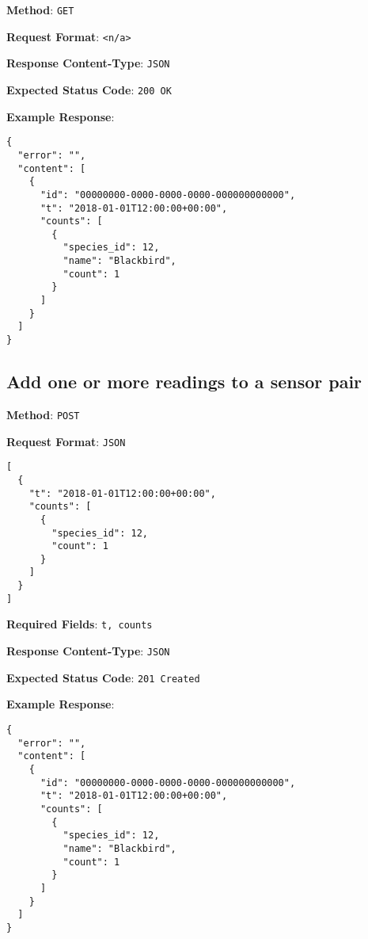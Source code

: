 \noindent
\textbf{Method}: \texttt{GET}

\noindent
\textbf{Request Format}: \texttt{<n/a>}

\noindent
\textbf{Response Content-Type}: \texttt{JSON}

\noindent
\textbf{Expected Status Code}: \texttt{200 OK}

\noindent
\textbf{Example Response}:
\begin{verbatim}
{ 
  "error": "",
  "content": [
    {
      "id": "00000000-0000-0000-0000-000000000000",
      "t": "2018-01-01T12:00:00+00:00",
      "counts": [
        {
          "species_id": 12,
          "name": "Blackbird",
          "count": 1
        }
      ]
    }
  ]
}
\end{verbatim}


\subsection{Add one or more readings to a sensor pair}

\noindent
\textbf{Method}: \texttt{POST}

\noindent
\textbf{Request Format}: \texttt{JSON}
\begin{verbatim}
[
  { 
    "t": "2018-01-01T12:00:00+00:00",
    "counts": [
      {
        "species_id": 12,
        "count": 1
      }
    ]
  }
]
\end{verbatim}

\noindent
\textbf{Required Fields}: \texttt{t, counts}

\noindent
\textbf{Response Content-Type}: \texttt{JSON}

\noindent
\textbf{Expected Status Code}: \texttt{201 Created}

\noindent
\textbf{Example Response}:
\begin{verbatim}
{ 
  "error": "",
  "content": [
    {
      "id": "00000000-0000-0000-0000-000000000000",
      "t": "2018-01-01T12:00:00+00:00",
      "counts": [
        {
          "species_id": 12,
          "name": "Blackbird",
          "count": 1
        }
      ]
    }
  ]
}
\end{verbatim}
